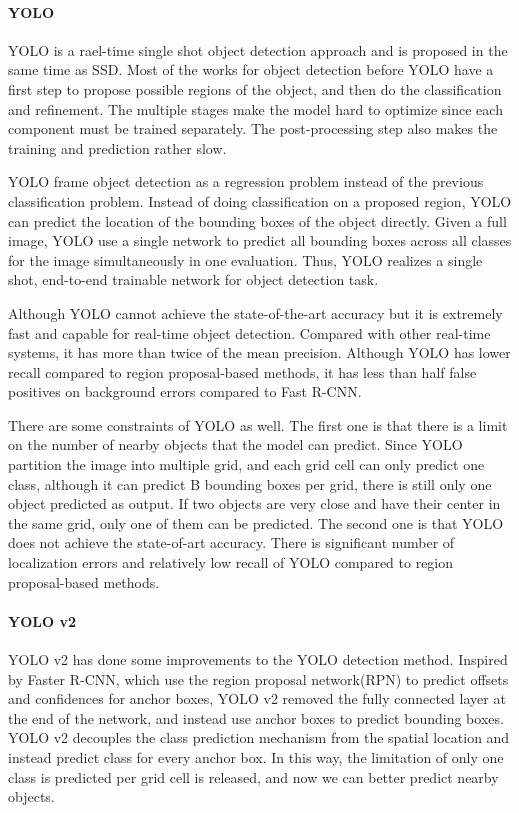 \paragraph{YOLO}
YOLO is a rael-time single shot object detection approach and is proposed in the same time as SSD. Most of the works for object detection before YOLO have a first step to propose possible regions of the object, and then do the classification and refinement. The multiple stages make the model hard to optimize since each component must be trained separately. The post-processing step also makes the training and prediction rather slow.

YOLO  frame object detection as a regression problem instead of the previous classification problem. Instead of doing classification on a proposed region, YOLO can predict the location of the bounding boxes of the object directly. Given a full image, YOLO use a single network to predict all bounding boxes across all classes for the image simultaneously in one evaluation. Thus, YOLO realizes a single shot, end-to-end trainable network for object detection task.

Although YOLO cannot achieve the state-of-the-art accuracy but it is extremely fast and capable for real-time object detection. Compared with other real-time systems, it has more than twice of the mean precision. Although YOLO has lower recall compared to region proposal-based methods, it has less than half false positives on background errors compared to Fast R-CNN.

There are some constraints of YOLO as well. The first one is that there is a limit on the number of nearby objects that the model can predict. Since YOLO partition the image into multiple grid, and each grid cell can only predict one class, although it can predict B bounding boxes per grid, there is still only one object predicted as output. If two objects are very close and have their center in the same grid, only one of them can be predicted. The second one is that YOLO does not achieve the state-of-art accuracy. There is significant number of localization errors and relatively low recall of YOLO compared to region proposal-based methods.

\paragraph{YOLO v2}
YOLO v2 has done some improvements to the YOLO detection method. Inspired by Faster R-CNN, which use the region proposal network(RPN) to predict offsets and confidences for anchor boxes, YOLO v2 removed the fully connected layer at the end of the network, and instead use anchor boxes to predict bounding boxes. YOLO v2 decouples the class prediction mechanism from the spatial location and instead predict class for every anchor box. In this way, the limitation of only one class is predicted per grid cell is released, and now we can better predict nearby objects.

